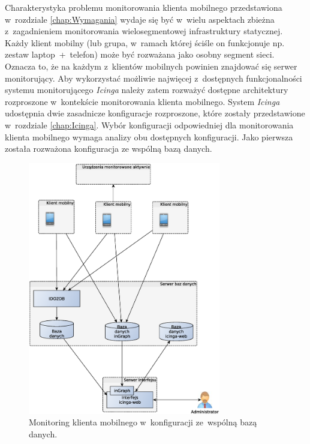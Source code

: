 Charakterystyka problemu monitorowania klienta mobilnego przedstawiona
w~rozdziale \ref{chap:Wymagania} wydaje się być w~wielu aspektach
zbieżna z~zagadnieniem monitorowania wielosegmentowej infrastruktury
statycznej. Każdy klient mobilny (lub grupa, w~ramach której ściśle on
funkcjonuje np. zestaw laptop~+~telefon) może być rozważana jako
osobny segment sieci. Oznacza to, że na każdym z~klientów mobilnych
powinien znajdować się serwer monitorujący. Aby wykorzystać możliwie
najwięcej z~dostępnych funkcjonalności systemu monitorującego {\em
  Icinga} należy zatem rozważyć dostępne architektury rozproszone
w~kontekście monitorowania klienta mobilnego. System {\em Icinga}
udostępnia dwie zasadnicze konfiguracje rozproszone, które zostały
przedstawione w~rozdziale \ref{chap:Icinga}. Wybór konfiguracji
odpowiedniej dla monitorowania klienta mobilnego wymaga analizy obu
dostępnych konfiguracji. Jako pierwsza została rozważona konfiguracja
ze wspólną bazą danych.

\begin{figure}[ht]
  \centering
  \caption{Monitoring klienta mobilnego w~konfiguracji ze~wspólną bazą
    danych.}
  \label{fig:mobilnyWspBaza}
\includegraphics[width=0.75\textwidth]{img/mobilnyWspBaza}
\end{figure}

